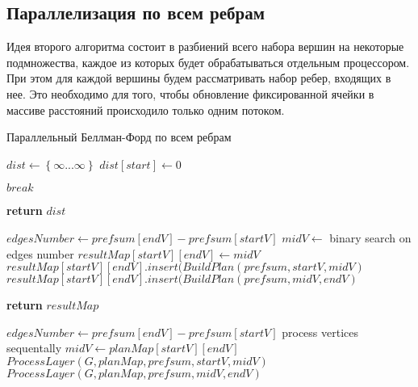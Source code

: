 \FloatBarrier
\subsection{Параллелизация по всем ребрам}
Идея второго алгоритма состоит в разбиений всего набора вершин на некоторые подмножества, каждое из которых будет обрабатываться отдельным процессором. При этом для каждой вершины будем рассматривать набор ребер, входящих в нее. Это необходимо для того, чтобы обновление фиксированной ячейки в массиве расстояний происходило только одним потоком. 

\FloatBarrier
\begin{algorithm}
\caption{Параллельный Беллман-Форд по всем ребрам}\label{bf_classic_par2}
\begin{algorithmic}[1]
\State $dist\gets \left\{ {\infty ... \infty}\right\}$
\State $dist[start] \gets 0$

		\State $break$						
	\EndIf
		
		
\EndFor
\State \textbf{return} $dist$
\EndProcedure

\State 
{}  

\State $edgesNumber \gets prefsum[endV] - prefsum[startV]$
	\State $midV \gets $ binary search on edges number
	\State $resultMap[startV][endV] \gets midV$ 
	\State $resultMap[startV][endV].insert(BuildPlan(prefsum, startV, midV)$ 
	\State $resultMap[startV][endV].insert(BuildPlan(prefsum, midV, endV)$ 					
\EndIf

\State \textbf{return} $resultMap$
\EndProcedure

\State 
{}  
\State $edgesNumber \gets prefsum[endV] - prefsum[startV]$
	\State process vertices sequentally 	
\Else	
	\State $midV \gets planMap[startV][endV]$ 
	\State $ProcessLayer(G, planMap, prefsum, startV, midV)$
	\State $ProcessLayer(G, planMap, prefsum, midV, endV)$	
\EndIf

\EndProcedure

\end{algorithmic}
\end{algorithm}

